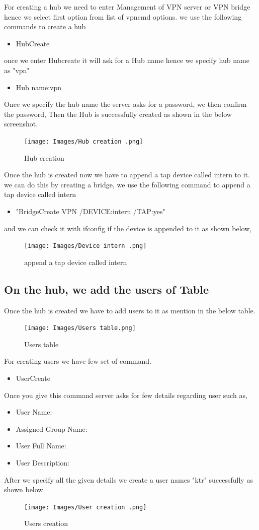 For creating a hub we need to enter Management of VPN server or VPN bridge hence we select first option from list of vpncmd options.
we use the following commands to create a hub 
\begin{itemize}
 \item HubCreate 
\end{itemize}
once we enter Hubcreate it will ask for a Hub name 
hence we specify hub name as "vpn"
\begin{itemize}
\item Hub name:vpn
\end{itemize}
Once we specify the hub name the server asks for a password, we then confirm the password, Then the Hub is successfully created as shown in the below screenshot.
\begin{figure}[H]
\centering
  \texttt{[image: Images/Hub creation .png]}
  \caption{Hub creation}
  \label{fig }
\end{figure}
Once the hub is created now we have to append a tap device called intern to it.
we can do this by creating a bridge, we use the following command to  append a tap device called intern
\begin{itemize}
\item "BridgeCreate VPN /DEVICE:intern /TAP:yes"
\end{itemize}
and we can check it with ifconfig if the device is appended to it as shown below,
\begin{figure}[H]
\centering
  \texttt{[image: Images/Device intern .png]}
  \caption{append a tap device called intern}
  \label{fig }
\end{figure}


\subsection{ On the hub, we add the users of Table}
Once the hub is created we have to add users to it as mention in the below table.
\begin{figure}[H]
\centering
  \texttt{[image: Images/Users table.png]}
  \caption{Users table}
  \label{fig }
\end{figure}
For creating users we have few set of command.
\begin{itemize}
    \item UserCreate
\end{itemize}
Once you give this command server asks for few details regarding user such as,
\begin{itemize}
\item User Name:
\item Assigned Group Name:
\item User Full Name: 
\item User Description: 
\end{itemize}
After we specify all the given details we create a user names "ktr" successfully as shown below.
\begin{figure}[H]
\centering
  \texttt{[image: Images/User creation .png]}
  \caption{Users creation}
  \label{fig }
\end{figure}

